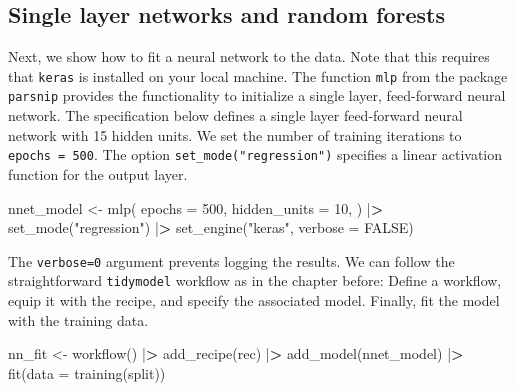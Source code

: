 \documentclass[
]{krantz}
\newenvironment{Shaded}{\begin{snugshade}}{\end{snugshade}}
\newcommand{\AttributeTok}[1]{\textcolor[rgb]{0.61,0.61,0.61}{#1}}
\newcommand{\ConstantTok}[1]{\textcolor[rgb]{0,0,0}{#1}}
\newcommand{\DecValTok}[1]{\textcolor[rgb]{0.06,0.06,0.06}{#1}}
\newcommand{\ErrorTok}[1]{\textcolor[rgb]{0.14,0.14,0.14}{\textbf{#1}}}
\newcommand{\FunctionTok}[1]{\textcolor[rgb]{0,0,0}{#1}}
\newcommand{\NormalTok}[1]{#1}
\newcommand{\OtherTok}[1]{\textcolor[rgb]{0.37,0.37,0.37}{#1}}
\newcommand{\SpecialCharTok}[1]{\textcolor[rgb]{0,0,0}{#1}}
\newcommand{\StringTok}[1]{\textcolor[rgb]{0.5,0.5,0.5}{#1}}
\begin{document}
\hypertarget{single-layer-networks-and-random-forests}{%
\subsection{Single layer networks and random forests}\label{single-layer-networks-and-random-forests}}

Next, we show how to fit a neural network to the data. Note that this requires that \texttt{keras} is installed on your local machine. The function \texttt{mlp} from the package \texttt{parsnip} provides the functionality to initialize a single layer, feed-forward neural network. The specification below defines a single layer feed-forward neural network with 15 hidden units. We set the number of training iterations to \texttt{epochs\ =\ 500}. The option \texttt{set\_mode("regression")} specifies a linear activation function for the output layer.

\begin{Shaded}
\begin{Highlighting}[]
\NormalTok{nnet\_model }\OtherTok{\textless{}{-}} \FunctionTok{mlp}\NormalTok{(}
  \AttributeTok{epochs =} \DecValTok{500}\NormalTok{,}
  \AttributeTok{hidden\_units =} \DecValTok{10}\NormalTok{,}
\NormalTok{) }\SpecialCharTok{|}\ErrorTok{\textgreater{}}
  \FunctionTok{set\_mode}\NormalTok{(}\StringTok{"regression"}\NormalTok{) }\SpecialCharTok{|}\ErrorTok{\textgreater{}}
  \FunctionTok{set\_engine}\NormalTok{(}\StringTok{"keras"}\NormalTok{, }\AttributeTok{verbose =} \ConstantTok{FALSE}\NormalTok{)}
\end{Highlighting}
\end{Shaded}

The \texttt{verbose=0} argument prevents logging the results. We can follow the straightforward \texttt{tidymodel} workflow as in the chapter before: Define a workflow, equip it with the recipe, and specify the associated model. Finally, fit the model with the training data.

\begin{Shaded}
\begin{Highlighting}[]
\NormalTok{nn\_fit }\OtherTok{\textless{}{-}} \FunctionTok{workflow}\NormalTok{() }\SpecialCharTok{|}\ErrorTok{\textgreater{}}
  \FunctionTok{add\_recipe}\NormalTok{(rec) }\SpecialCharTok{|}\ErrorTok{\textgreater{}}
  \FunctionTok{add\_model}\NormalTok{(nnet\_model) }\SpecialCharTok{|}\ErrorTok{\textgreater{}}
  \FunctionTok{fit}\NormalTok{(}\AttributeTok{data =} \FunctionTok{training}\NormalTok{(split))}
\end{Highlighting}
\end{Shaded}
\end{document}
